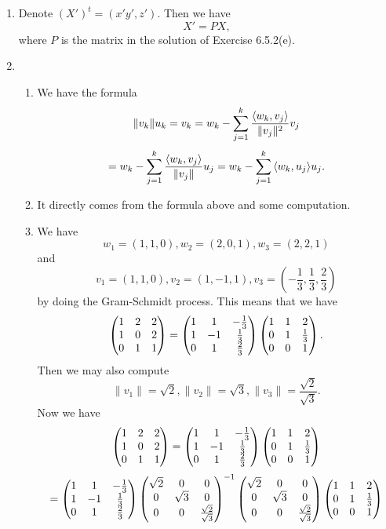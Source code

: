 \begin{enumerate}
\begin{enumerate}
\end{enumerate}
\item Denote $(X')^t=(x'y',z')$. Then we have 
\[X'=PX,\]
where $P$ is the matrix in the solution of Exercise 6.5.2(e).
\item \begin{enumerate}
\item We have the formula
\[\|v_k\|u_k=v_k=w_k-\sum_{j=1}^k{\frac{\langle w_k,v_j\rangle }{\|v_j\|^2}v_j}\]
\[=w_k-\sum_{j=1}^k{\frac{\langle w_k,v_j\rangle }{\|v_j\|}u_j}=w_k-\sum_{j=1}^k{\langle w_k,u_j\rangle u_j}.\]
\item It directly comes from the formula above and some computation.
\item We have 
\[w_1=(1,1,0),w_2=(2,0,1),w_3=(2,2,1)\]
and 
\[v_1=(1,1,0),v_2=(1,-1,1),v_3=(-\frac{1}{3},\frac{1}{3},\frac{2}{3})\]
by doing the Gram-Schmidt process.
This means that we have 
\[\begin{pmatrix}1 & 2 & 2\cr 1 & 0 & 2\cr 0 & 1 & 1\end{pmatrix}=\begin{pmatrix}1 & 1 & -\frac{1}{3}\cr 1 & -1 & \frac{1}{3}\cr 0 & 1 & \frac{2}{3}\end{pmatrix}\begin{pmatrix}1 & 1 & 2\cr 0 & 1 & \frac{1}{3}\cr 0 & 0 & 1\end{pmatrix}.\]
Then we may also compute 
\[\|v_1\|=\sqrt{2},\|v_2\|=\sqrt{3},\|v_3\|=\frac{\sqrt{2}}{\sqrt{3}}.\]
Now we have 
\[\begin{pmatrix}1 & 2 & 2\cr 1 & 0 & 2\cr 0 & 1 & 1\end{pmatrix}=\begin{pmatrix}1 & 1 & -\frac{1}{3}\cr 1 & -1 & \frac{1}{3}\cr 0 & 1 & \frac{2}{3}\end{pmatrix}\begin{pmatrix}1 & 1 & 2\cr 0 & 1 & \frac{1}{3}\cr 0 & 0 & 1\end{pmatrix}\]
\[=\begin{pmatrix}1 & 1 & -\frac{1}{3}\cr 1 & -1 & \frac{1}{3}\cr 0 & 1 & \frac{2}{3}\end{pmatrix}\begin{pmatrix}\sqrt{2} & 0 & 0\cr 0 & \sqrt{3} & 0\cr 0 & 0 & \frac{\sqrt{2}}{\sqrt{3}}\end{pmatrix}^{-1}\begin{pmatrix}\sqrt{2} & 0 & 0\cr 0 & \sqrt{3} & 0\cr 0 & 0 & \frac{\sqrt{2}}{\sqrt{3}}\end{pmatrix}\begin{pmatrix}1 & 1 & 2\cr 0 & 1 & \frac{1}{3}\cr 0 & 0 & 1\end{pmatrix}\]

\end{enumerate}
\end{enumerate}
